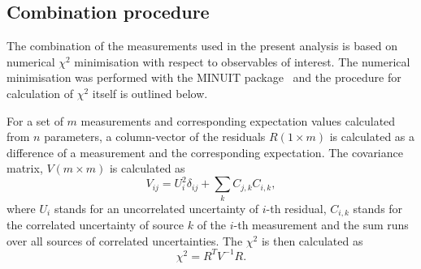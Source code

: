 \subsection{Combination procedure}
\label{sec:comb:proc}
The combination of the measurements used in the present analysis is 
based on numerical $\chi^2$ minimisation with respect to observables of 
interest.
The numerical minimisation was performed with the MINUIT 
package~\cite{minuit} and the procedure for calculation of $\chi^2$ 
itself is outlined below.
%

For a set of $m$ measurements and corresponding expectation values
 calculated 
from $n$ parameters, a column-vector of the residuals $R(1\times m)$ is 
calculated as a difference of a measurement and the corresponding 
expectation.  The covariance matrix, $V(m \times m)$  is calculated  as 
$$V_{ij}=U^2_{i}\delta_{ij}+\sum_{k}C_{j,k}C_{i,k},$$
where $U_{i}$ stands for an uncorrelated uncertainty of $i$-th residual, 
$C_{i,k}$ stands for the correlated uncertainty of source $k$ of the 
$i$-th measurement and the sum runs over all sources of correlated 
uncertainties.
%
The $\chi^2$ is then calculated as 
$$\chi^2=R^{T}V^{-1}R.$$

